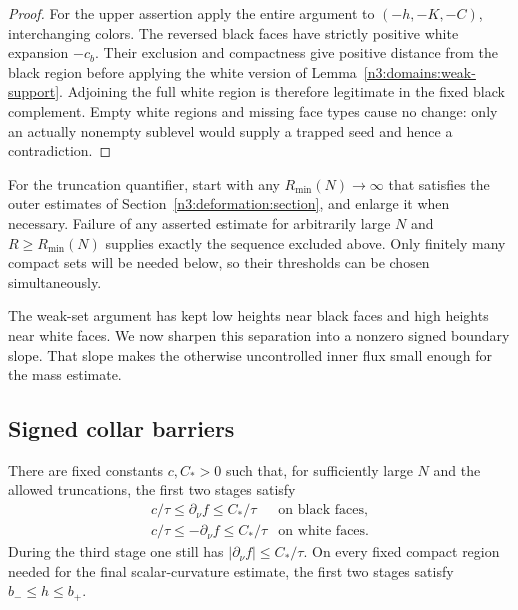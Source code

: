 \begin{proof}
For the upper assertion apply the entire argument to
$(-h,-K,-C)$, interchanging colors.  The reversed black faces have
strictly positive white expansion $-c_b$.  Their exclusion and
compactness give positive distance from the black region before
applying the white version of Lemma~\ref{n3:domains:weak-support}.
Adjoining the full white region is therefore legitimate in the
fixed black complement.  Empty white regions and missing face types
cause no change: only an actually nonempty sublevel would supply a
trapped seed and hence a contradiction.
\end{proof}

For the truncation quantifier, start with any $R_{\min}(N)\to\infty$
that satisfies the outer estimates of
Section~\ref{n3:deformation:section}, and enlarge it when necessary.
Failure of any asserted estimate for arbitrarily large $N$ and
$R\ge R_{\min}(N)$ supplies exactly the sequence excluded above.
Only finitely many compact sets will be needed below, so their
thresholds can be chosen simultaneously.

The weak-set argument has kept low heights near black faces and high
heights near white faces. We now sharpen this separation into a
nonzero signed boundary slope. That slope makes the otherwise
uncontrolled inner flux small enough for the mass estimate.

\subsection{Signed collar barriers}

\begin{lemma}
\label{n3:apriori:collars}
There are fixed constants $c,C_*>0$ such that, for sufficiently large
$N$ and the allowed truncations, the first two stages satisfy
\begin{equation}
 \begin{array}{ll}
 c/\tau\le\partial_\nu f\le C_*/\tau&\text{on black faces},\\[2pt]
 c/\tau\le-\partial_\nu f\le C_*/\tau&\text{on white faces}.
 \end{array}
 \label{n3:apriori:signed-slopes}
\end{equation}
During the third stage one still has
$|\partial_\nu f|\le C_*/\tau$.  On every fixed compact region needed
for the final scalar-curvature estimate, the first two stages satisfy
$b_-\le h\le b_+$.
\end{lemma}

